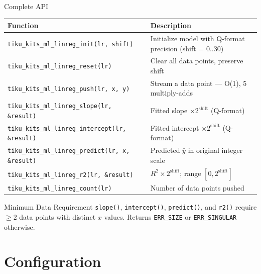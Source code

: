 \documentclass[aspectratio=169, 10pt]{beamer}
\begin{document}
\begin{frame}[fragile]{Complete API}
\begin{table}
\centering
\small
\begin{tabular}{@{}lp{8.5cm}@{}}
\toprule
\textbf{Function} & \textbf{Description} \\
\midrule
\texttt{tiku\_kits\_ml\_linreg\_init(lr, shift)}
  & Initialize model with Q-format precision (shift = 0..30) \\
\texttt{tiku\_kits\_ml\_linreg\_reset(lr)}
  & Clear all data points, preserve shift \\
\texttt{tiku\_kits\_ml\_linreg\_push(lr, x, y)}
  & Stream a data point --- O(1), 5 multiply-adds \\
\midrule
\texttt{tiku\_kits\_ml\_linreg\_slope(lr, \&result)}
  & Fitted slope $\times 2^{\text{shift}}$ (Q-format) \\
\texttt{tiku\_kits\_ml\_linreg\_intercept(lr, \&result)}
  & Fitted intercept $\times 2^{\text{shift}}$ (Q-format) \\
\texttt{tiku\_kits\_ml\_linreg\_predict(lr, x, \&result)}
  & Predicted $\hat{y}$ in original integer scale \\
\texttt{tiku\_kits\_ml\_linreg\_r2(lr, \&result)}
  & $R^2 \times 2^{\text{shift}}$; range $[0, 2^{\text{shift}}]$ \\
\midrule
\texttt{tiku\_kits\_ml\_linreg\_count(lr)}
  & Number of data points pushed \\
\bottomrule
\end{tabular}
\end{table}

\vspace{0.3em}
\begin{alertblock}{Minimum Data Requirement}
\texttt{slope()}, \texttt{intercept()}, \texttt{predict()}, and \texttt{r2()}
require $\geq 2$ data points with distinct $x$ values.
Returns \texttt{ERR\_SIZE} or \texttt{ERR\_SINGULAR} otherwise.
\end{alertblock}
\end{frame}

\section{Configuration}
\end{document}
